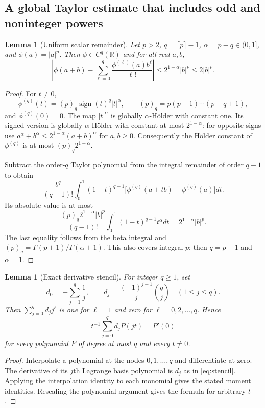 \documentclass[11pt,letterpaper]{article}
\newtheorem{lemma}[theorem]{Lemma}
\theoremstyle{definition}
\theoremstyle{remark}
\numberwithin{equation}{section}
\newcommand{\R}{\mathbb R}
\DeclareMathOperator{\sign}{sign}
\begin{document}
\subsection{A global Taylor estimate that includes odd and noninteger powers}
\begin{lemma}[Uniform scalar remainder]\label{lem:Taylor}
Let $p>2$, $q=\lceil p\rceil-1$, $\alpha=p-q\in(0,1]$, and $\phi(a)=|a|^p$. Then $\phi\in C^q(\R)$ and for all real $a,b$,
\begin{equation}\label{eq:Taylor}
 \left|\phi(a+b)-\sum_{\ell=0}^q\frac{\phi^{(\ell)}(a)b^\ell}{\ell!}\right|
 \le2^{1-\alpha}|b|^p\le2|b|^p.
\end{equation}
\end{lemma}
\begin{proof}
For $t\ne0$,
\[
 \phi^{(q)}(t)=(p)_q\sign(t)^q|t|^\alpha,
 \qquad (p)_q=p(p-1)\cdots(p-q+1),
\]
and $\phi^{(q)}(0)=0$. The map $|t|^\alpha$ is globally $\alpha$-H\"older with constant one. Its signed version is globally $\alpha$-H\"older with constant at most $2^{1-\alpha}$: for opposite signs use
$a^\alpha+b^\alpha\le2^{1-\alpha}(a+b)^\alpha$ for $a,b\ge0$.
Consequently the H\"older constant of $\phi^{(q)}$ is at most $(p)_q2^{1-\alpha}$.

Subtract the order-$q$ Taylor polynomial from the integral remainder of order $q-1$ to obtain
\[
 \frac{b^q}{(q-1)!}\int_0^1(1-t)^{q-1}
 \bigl[\phi^{(q)}(a+tb)-\phi^{(q)}(a)\bigr]dt.
\]
Its absolute value is at most
\[
 \frac{(p)_q2^{1-\alpha}|b|^p}{(q-1)!}
 \int_0^1(1-t)^{q-1}t^\alpha dt
 =2^{1-\alpha}|b|^p.
\]
The last equality follows from the beta integral and
$(p)_q=\Gamma(p+1)/\Gamma(\alpha+1)$. This also covers integral $p$: then $q=p-1$ and $\alpha=1$.
\end{proof}

\begin{lemma}[Exact derivative stencil]\label{lem:stencil}
For integer $q\ge1$, set
\begin{equation}\label{eq:stencil}
 d_0=-\sum_{j=1}^q\frac1j,\qquad
 d_j=\frac{(-1)^{j+1}}j\binom qj\quad(1\le j\le q).
\end{equation}
Then $\sum_{j=0}^qd_jj^\ell$ is one for $\ell=1$ and zero for $\ell=0,2,\ldots,q$. Hence
\[
 t^{-1}\sum_{j=0}^qd_jP(jt)=P'(0)
\]
for every polynomial $P$ of degree at most $q$ and every $t\ne0$.
\end{lemma}
\begin{proof}
Interpolate a polynomial at the nodes $0,1,\ldots,q$ and differentiate at zero. The derivative of its $j$th Lagrange basis polynomial is $d_j$ as in \eqref{eq:stencil}. Applying the interpolation identity to each monomial gives the stated moment identities. Rescaling the polynomial argument gives the formula for arbitrary $t$.
\end{proof}
\end{document}
